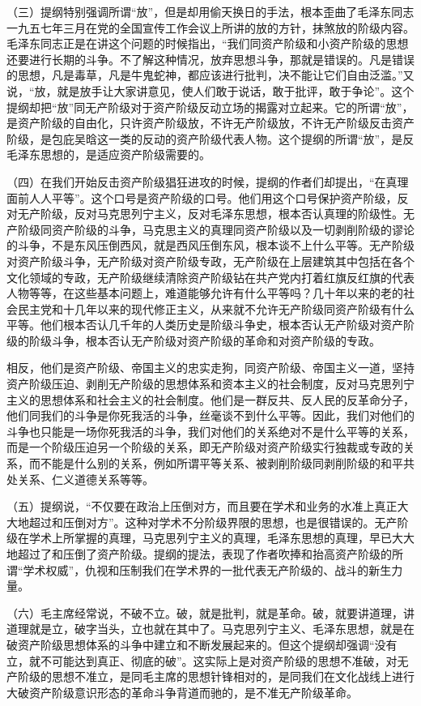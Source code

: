 （三）提纲特别强调所谓“放”，但是却用偷天换日的手法，根本歪曲了毛泽东同志一九五七年三月在党的全国宣传工作会议上所讲的放的方针，抹煞放的阶级内容。毛泽东同志正是在讲这个问题的时候指出，“我们同资产阶级和小资产阶级的思想还要进行长期的斗争。不了解这种情况，放弃思想斗争，那就是错误的。凡是错误的思想，凡是毒草，凡是牛鬼蛇神，都应该进行批判，决不能让它们自由泛滥。”又说，“放，就是放手让大家讲意见，使人们敢于说话，敢于批评，敢于争论”。这个提纲却把“放”同无产阶级对于资产阶级反动立场的揭露对立起来。它的所谓“放”，是资产阶级的自由化，只许资产阶级放，不许无产阶级放，不许无产阶级反击资产阶级，是包庇吴晗这一类的反动的资产阶级代表人物。这个提纲的所谓“放”，是反毛泽东思想的，是适应资产阶级需要的。

（四）在我们开始反击资产阶级猖狂进攻的时候，提纲的作者们却提出，“在真理面前人人平等”。这个口号是资产阶级的口号。他们用这个口号保护资产阶级，反对无产阶级，反对马克思列宁主义，反对毛泽东思想，根本否认真理的阶级性。无产阶级同资产阶级的斗争，马克思主义的真理同资产阶级以及一切剥削阶级的谬论的斗争，不是东风压倒西风，就是西风压倒东风，根本谈不上什么平等。无产阶级对资产阶级斗争，无产阶级对资产阶级专政，无产阶级在上层建筑其中包括在各个文化领域的专政，无产阶级继续清除资产阶级钻在共产党内打着红旗反红旗的代表人物等等，在这些基本问题上，难道能够允许有什么平等吗？几十年以来的老的社会民主党和十几年以来的现代修正主义，从来就不允许无产阶级同资产阶级有什么平等。他们根本否认几千年的人类历史是阶级斗争史，根本否认无产阶级对资产阶级的阶级斗争，根本否认无产阶级对资产阶级的革命和对资产阶级的专政。

相反，他们是资产阶级、帝国主义的忠实走狗，同资产阶级、帝国主义一道，坚持资产阶级压迫、剥削无产阶级的思想体系和资本主义的社会制度，反对马克思列宁主义的思想体系和社会主义的社会制度。他们是一群反共、反人民的反革命分子，他们同我们的斗争是你死我活的斗争，丝毫谈不到什么平等。因此，我们对他们的斗争也只能是一场你死我活的斗争，我们对他们的关系绝对不是什么平等的关系，而是一个阶级压迫另一个阶级的关系，即无产阶级对资产阶级实行独裁或专政的关系，而不能是什么别的关系，例如所谓平等关系、被剥削阶级同剥削阶级的和平共处关系、仁义道德关系等等。

（五）提纲说，“不仅要在政治上压倒对方，而且要在学术和业务的水准上真正大大地超过和压倒对方”。这种对学术不分阶级界限的思想，也是很错误的。无产阶级在学术上所掌握的真理，马克思列宁主义的真理，毛泽东思想的真理，早已大大地超过了和压倒了资产阶级。提纲的提法，表现了作者吹捧和抬高资产阶级的所谓“学术权威”，仇视和压制我们在学术界的一批代表无产阶级的、战斗的新生力量。

（六）毛主席经常说，不破不立。破，就是批判，就是革命。破，就要讲道理，讲道理就是立，破字当头，立也就在其中了。马克思列宁主义、毛泽东思想，就是在破资产阶级思想体系的斗争中建立和不断发展起来的。但这个提纲却强调“没有立，就不可能达到真正、彻底的破”。这实际上是对资产阶级的思想不准破，对无产阶级的思想不准立，是同毛主席的思想针锋相对的，是同我们在文化战线上进行大破资产阶级意识形态的革命斗争背道而驰的，是不准无产阶级革命。

